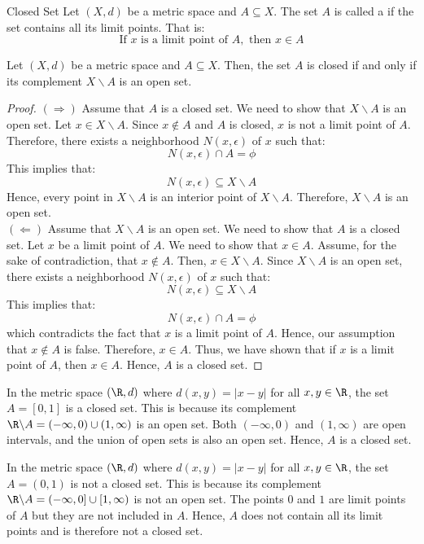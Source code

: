 \documentclass[openany]{book}
\begin{document}
\begin{mydefinition}{Closed Set}
    Let $(X, d)$ be a metric space and $A \subseteq X$. The set $A$ is called a  if the set contains all its limit points. That is:
    $$\text{If } x \text{ is a limit point of } A, \text{ then } x \in A$$
\end{mydefinition}
\begin{mytheorem}
    Let $(X, d)$ be a metric space and $A \subseteq X$. Then, the set $A$ is closed if and only if its complement $X \backslash A$ is an open set.
\end{mytheorem}
\begin{proof}
    $(\Rightarrow)$ Assume that $A$ is a closed set. We need to show that $X \backslash A$ is an open set. Let $x \in X \backslash A$. Since $x \notin A$ and $A$ is closed, $x$ is not a limit point of $A$. Therefore, there exists a neighborhood $N(x, \epsilon)$ of $x$ such that:
    $$N(x, \epsilon) \cap A = \phi$$
    This implies that:
    $$N(x, \epsilon) \subseteq X \backslash A$$
    Hence, every point in $X \backslash A$ is an interior point of $X \backslash A$. Therefore, $X \backslash A$ is an open set. \\
    $(\Leftarrow)$ Assume that $X \backslash A$ is an open set. We need to show that $A$ is a closed set. Let $x$ be a limit point of $A$. We need to show that $x \in A$. Assume, for the sake of contradiction, that $x \notin A$. Then, $x \in X \backslash A$. Since $X \backslash A$ is an open set, there exists a neighborhood $N(x, \epsilon)$ of $x$ such that:
    $$N(x, \epsilon) \subseteq X \backslash A$$
    This implies that:
    $$N(x, \epsilon) \cap A = \phi$$
    which contradicts the fact that $x$ is a limit point of $A$. Hence, our assumption that $x \notin A$ is false. Therefore, $x \in A$. Thus, we have shown that if $x$ is a limit point of $A$, then $x \in A$. Hence, $A$ is a closed set.
\end{proof}
\begin{example}
    In the metric space $(\R, d)$ where $d(x, y) = |x - y|$ for all $x, y \in \R$, the set $A = [0, 1]$ is a closed set. This is because its complement $\R \backslash A = (-\infty, 0) \cup (1, \infty)$ is an open set. Both $(-\infty, 0)$ and $(1, \infty)$ are open intervals, and the union of open sets is also an open set. Hence, $A$ is a closed set.
\end{example}
\begin{example}
    In the metric space $(\R, d)$ where $d(x, y) = |x - y|$ for all $x, y \in \R$, the set $A = (0, 1)$ is not a closed set. This is because its complement $\R \backslash A = (-\infty, 0] \cup [1, \infty)$ is not an open set. The points $0$ and $1$ are limit points of $A$ but they are not included in $A$. Hence, $A$ does not contain all its limit points and is therefore not a closed set.
\end{example}
\end{document}
